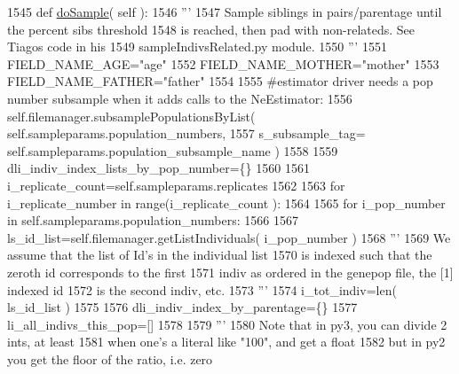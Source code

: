 \begin{DoxyCode}
1545     \textcolor{keyword}{def }\hyperlink{classnegui_1_1genepopfilesampler_1_1GenepopFileSamplerIndividualsAgeStructureRelateds_a2c1d8215c48697cf7f81ba45c31435aa}{doSample}( self ):
1546         \textcolor{stringliteral}{'''}
1547 \textcolor{stringliteral}{        Sample siblings in pairs/parentage until the percent sibs threshold}
1548 \textcolor{stringliteral}{        is reached, then pad with non-relateds.  See Tiagos code in his }
1549 \textcolor{stringliteral}{        sampleIndivsRelated.py module.}
1550 \textcolor{stringliteral}{        '''}
1551         FIELD\_NAME\_AGE=\textcolor{stringliteral}{"age"}
1552         FIELD\_NAME\_MOTHER=\textcolor{stringliteral}{"mother"}
1553         FIELD\_NAME\_FATHER=\textcolor{stringliteral}{"father"}
1554 
1555         \textcolor{comment}{#estimator driver needs a pop number subsample when it adds calls to the NeEstimator:}
1556         self.filemanager.subsamplePopulationsByList( self.sampleparams.population\_numbers,
1557                                                     s\_subsample\_tag=
      self.sampleparams.population\_subsample\_name )
1558 
1559         dli\_indiv\_index\_lists\_by\_pop\_number=\{\}
1560         
1561         i\_replicate\_count=self.sampleparams.replicates
1562 
1563         \textcolor{keywordflow}{for} i\_replicate\_number \textcolor{keywordflow}{in} range(i\_replicate\_count ):
1564 
1565             \textcolor{keywordflow}{for} i\_pop\_number \textcolor{keywordflow}{in} self.sampleparams.population\_numbers:
1566 
1567                 ls\_id\_list=self.filemanager.getListIndividuals( i\_pop\_number )
1568                 \textcolor{stringliteral}{'''}
1569 \textcolor{stringliteral}{                We assume that the list of Id's in the individual list}
1570 \textcolor{stringliteral}{                is indexed such that the zeroth id corresponds to the first}
1571 \textcolor{stringliteral}{                indiv as ordered in the genepop file, the [1] indexed id}
1572 \textcolor{stringliteral}{                is the second indiv, etc.}
1573 \textcolor{stringliteral}{                '''}
1574                 i\_tot\_indiv=len( ls\_id\_list )
1575 
1576                 dli\_indiv\_index\_by\_parentage=\{\}
1577                 li\_all\_indivs\_this\_pop=[]
1578 
1579                 \textcolor{stringliteral}{'''}
1580 \textcolor{stringliteral}{                Note that in py3, you can divide 2 ints, at least}
1581 \textcolor{stringliteral}{                when one's a literal like "100", and get a float}
1582 \textcolor{stringliteral}{                but in py2 you get the floor of the ratio, i.e. zero}

\end{DoxyCode}
